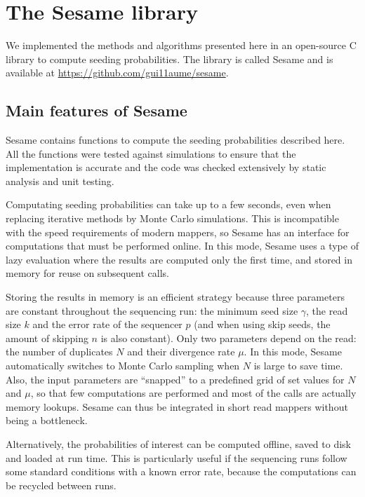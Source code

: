 \documentclass{article}
\begin{document}
\section{The Sesame library}
\label{sec:sesame}

We implemented the methods and algorithms presented here in an open-source
C library to compute seeding probabilities. The library is called Sesame
and is available at \url{https://github.com/gui11aume/sesame}.

\subsection{Main features of Sesame}

Sesame contains functions to compute the seeding probabilities described
here. All the functions were tested against simulations to ensure that the
implementation is accurate and the code was checked extensively by static
analysis and unit testing.

Computating seeding probabilities can take up to a few seconds, even when
replacing iterative methods by Monte Carlo simulations. This is
incompatible with the speed requirements of modern mappers, so Sesame has
an interface for computations that must be performed online. In this mode,
Sesame uses a type of lazy evaluation where the results are computed only
the first time, and stored in memory for reuse on subsequent calls.

Storing the results in memory is an efficient strategy because three
parameters are constant throughout the sequencing run: the minimum seed
size $\gamma$, the read size $k$ and the error rate of the sequencer $p$
(and when using skip seeds, the amount of skipping $n$ is also constant).
Only two parameters depend on the read: the number of duplicates $N$ and
their divergence rate $\mu$. In this mode, Sesame automatically switches
to Monte Carlo sampling when $N$ is large to save time. Also, the input
parameters are ``snapped'' to a predefined grid of set values for $N$ and
$\mu$, so that few computations are performed and most of the calls are
actually memory lookups. Sesame can thus be integrated in short read
mappers without being a bottleneck.

Alternatively, the probabilities of interest can be computed offline,
saved to disk and loaded at run time. This is particularly useful if the
sequencing runs follow some standard conditions with a known error rate,
because the computations can be recycled between runs.
\end{document}
